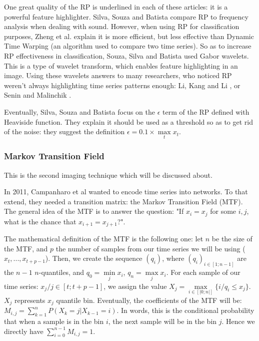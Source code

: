 \documentclass[11pt]{article}
\begin{document}
\begin{onehalfspace}
One great quality of the RP is underlined in each of these articles: it is a powerful feature highlighter. Silva, Souza and Batista \cite{silva} compare RP to frequency analysis when dealing with sound. However, when using RP for classification purposes, Zheng et al. \cite{zheng} explain it is more efficient, but less effective than Dynamic Time Warping (an algorithm used to compare two time series). So as to increase RP effectiveness in classification, Souza, Silva and Batista \cite{souza} used Gabor wavelets. This is a type of wavelet transform, which enables feature highlighting in an image. Using these wavelets answers to many researchers, who noticed RP weren't always highlighting time series patterns enough: Li, Kang and Li \cite{li}, or Senin and Malinchik \cite{senin}. 

Eventually, Silva, Souza and Batista \cite{silva} focus on the $\epsilon$ term of the RP defined with Heaviside function. They explain it should be used as a threshold so as to get rid of the noise: they suggest the definition $\epsilon = 0.1 \times \max\limits_t x_t$.

\subsubsection{Markov Transition Field}

This is the second imaging technique which will be discussed about. 

In 2011, Campanharo et al \cite{campanharo} wanted to encode time series into networks. To that extend, they needed a transition matrix: the Markov Transition Field (MTF). The general idea of the MTF is to answer the question: "If $x_i = x_j$ for some $i,j$, what is the chance that $x_{i+1} = x_{j+1}$?". 

The mathematical definition of the MTF is the following one: let $n$ be the size of the MTF, and $p$ the number of samples from our time series we will be using ($x_t,...,x_{t+p-1}$). Then, we create the sequence $(q_i)$, where $(q_i)_{i \in [1;n-1]}$ are the $n-1$ $n$-quantiles, and $q_0 = \min\limits_j x_i$, $q_n = \max\limits_j x_i$. For each sample of our time series: $x_j / j \in [t;t+p-1]$, we assign the value $X_j = \max\limits_{i \in [|0;n|]} \{ i / q_i \leq x_j\}$. $X_j$ represents $x_j$ quantile bin. Eventually, the coefficients of the MTF will be: $M_{i,j} = \sum\limits_{k=1}^{n} P(X_k = j | X_{k-1} = i)$. In words, this is the conditional probability that when a sample is in the bin $i$, the next sample will be in the bin $j$. Hence we directly have $\sum\limits_{i=0}^{n-1} M_{i,j} = 1$. 


\end{onehalfspace}
\end{document}
